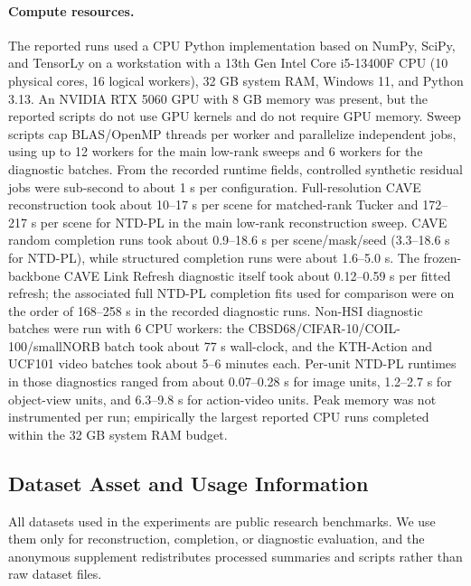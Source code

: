 \paragraph{Compute resources.}
\label{app:compute-resources}
The reported runs used a CPU Python implementation based on NumPy, SciPy, and
TensorLy on a workstation with a 13th Gen Intel Core i5-13400F CPU
(10 physical cores, 16 logical workers), 32 GB system RAM, Windows 11, and
Python 3.13. An NVIDIA RTX 5060 GPU with 8 GB memory was present, but the
reported scripts do not use GPU kernels and do not require GPU memory. Sweep
scripts cap BLAS/OpenMP threads per worker and parallelize independent jobs,
using up to 12 workers for the main low-rank sweeps and 6 workers for the
diagnostic batches. From the recorded runtime fields, controlled synthetic
residual jobs were sub-second to about 1 s per configuration. Full-resolution
CAVE reconstruction took about 10--17 s per scene for matched-rank Tucker and
172--217 s per scene for NTD-PL in the main low-rank reconstruction sweep.
CAVE random completion runs took about 0.9--18.6 s per scene/mask/seed
(3.3--18.6 s for NTD-PL), while structured completion runs were about
1.6--5.0 s. The frozen-backbone CAVE Link Refresh diagnostic itself took about
0.12--0.59 s per fitted refresh; the associated full NTD-PL completion fits
used for comparison were on the order of 168--258 s in the recorded diagnostic
runs. Non-HSI diagnostic batches were run with 6 CPU workers: the
CBSD68/CIFAR-10/COIL-100/smallNORB batch took about 77 s wall-clock, and the
KTH-Action and UCF101 video batches took about 5--6 minutes each. Per-unit
NTD-PL runtimes in those diagnostics ranged from about 0.07--0.28 s for image
units, 1.2--2.7 s for object-view units, and 6.3--9.8 s for action-video
units. Peak memory was not instrumented per run; empirically the largest
reported CPU runs completed within the 32 GB system RAM budget.

\subsection{Dataset Asset and Usage Information}
\label{app:dataset-assets}

All datasets used in the experiments are public research benchmarks. We use
them only for reconstruction, completion, or diagnostic evaluation, and the
anonymous supplement redistributes processed summaries and scripts rather than
raw dataset files.

